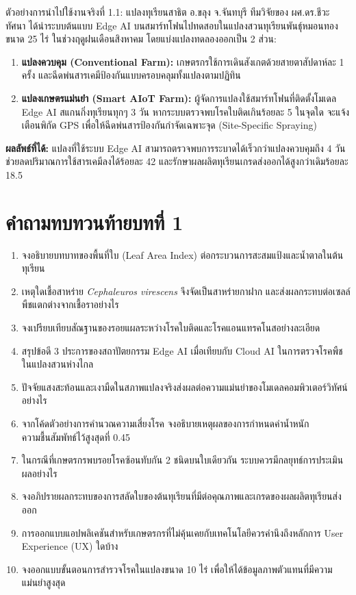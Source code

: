 \begin{casestudybox}{ตัวอย่างการนำไปใช้งานจริงที่ 1.1: แปลงทุเรียนสาธิต อ.ขลุง จ.จันทบุรี}
ทีมวิจัยของ ผศ.ดร.ชีวะ ทัศนา ได้นำระบบต้นแบบ Edge AI บนสมาร์ทโฟนไปทดสอบในแปลงสวนทุเรียนพันธุ์หมอนทองขนาด 25 ไร่ ในช่วงฤดูฝนเดือนสิงหาคม โดยแบ่งแปลงทดลองออกเป็น 2 ส่วน:
\begin{enumerate}[leftmargin=1.4em, itemsep=2pt]
    \item \textbf{แปลงควบคุม (Conventional Farm):} เกษตรกรใช้การเดินสังเกตด้วยสายตาสัปดาห์ละ 1 ครั้ง และฉีดพ่นสารเคมีป้องกันแบบครอบคลุมทั้งแปลงตามปฏิทิน
    \item \textbf{แปลงเกษตรแม่นยำ (Smart AIoT Farm):} ผู้จัดการแปลงใช้สมาร์ทโฟนที่ติดตั้งโมเดล Edge AI สแกนกิ่งทุเรียนทุกๆ 3 วัน หากระบบตรวจพบโรคใบติดเกินร้อยละ 5 ในจุดใด จะแจ้งเตือนพิกัด GPS เพื่อให้ฉีดพ่นสารป้องกันกำจัดเฉพาะจุด (Site-Specific Spraying)
\end{enumerate}
\textbf{ผลลัพธ์ที่ได้:} แปลงที่ใช้ระบบ Edge AI สามารถตรวจพบการระบาดได้เร็วกว่าแปลงควบคุมถึง 4 วัน ช่วยลดปริมาณการใช้สารเคมีลงได้ร้อยละ 42 และรักษาผลผลิตทุเรียนเกรดส่งออกได้สูงกว่าเดิมร้อยละ 18.5
\end{casestudybox}

\section*{คำถามทบทวนท้ายบทที่ 1}
\begin{enumerate}[leftmargin=1.8em, itemsep=4pt]
    \item จงอธิบายบทบาทของพื้นที่ใบ (Leaf Area Index) ต่อกระบวนการสะสมแป้งและน้ำตาลในต้นทุเรียน
    \item เหตุใดเชื้อสาหร่าย \textit{Cephaleuros virescens} จึงจัดเป็นสาหร่ายกาฝาก และส่งผลกระทบต่อเซลล์พืชแตกต่างจากเชื้อราอย่างไร
    \item จงเปรียบเทียบสัณฐานของรอยแผลระหว่างโรคใบติดและโรคแอนแทรคโนสอย่างละเอียด
    \item สรุปข้อดี 3 ประการของสถาปัตยกรรม Edge AI เมื่อเทียบกับ Cloud AI ในการตรวจโรคพืชในแปลงสวนห่างไกล
    \item ปัจจัยแสงสะท้อนและเงามืดในสภาพแปลงจริงส่งผลต่อความแม่นยำของโมเดลคอมพิวเตอร์วิทัศน์อย่างไร
    \item จากโค้ดตัวอย่างการคำนวณความเสี่ยงโรค จงอธิบายเหตุผลของการกำหนดค่าน้ำหนักความชื้นสัมพัทธ์ไว้สูงสุดที่ 0.45
    \item ในกรณีที่เกษตรกรพบรอยโรคซ้อนทับกัน 2 ชนิดบนใบเดียวกัน ระบบควรมีกลยุทธ์การประเมินผลอย่างไร
    \item จงอภิปรายผลกระทบของการสลัดใบของต้นทุเรียนที่มีต่อคุณภาพและเกรดของผลผลิตทุเรียนส่งออก
    \item การออกแบบแอปพลิเคชันสำหรับเกษตรกรที่ไม่คุ้นเคยกับเทคโนโลยีควรคำนึงถึงหลักการ User Experience (UX) ใดบ้าง
    \item จงออกแบบขั้นตอนการสำรวจโรคในแปลงขนาด 10 ไร่ เพื่อให้ได้ข้อมูลภาพตัวแทนที่มีความแม่นยำสูงสุด
\end{enumerate}

